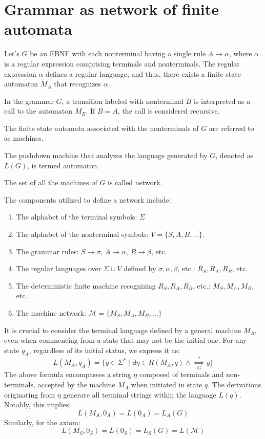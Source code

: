 \section{Grammar as network of finite automata}

Let's $G$ be an EBNF with each nonterminal having a single rule $A \rightarrow \alpha$, where $\alpha$ is a regular expression comprising terminals and nonterminals.
The regular expression $\alpha$ defines a regular language, and thus, there exists a finite state automaton $M_A$ that recognizes $\alpha$.

In the grammar $G$, a transition labeled with nonterminal $B$ is interpreted as a call to the automaton $M_B$.
If $B=A$, the call is considered recursive.

\begin{definition}
    The finite state automata associated with the nonterminals of $G$ are referred to as machines. 
\end{definition}
\begin{definition}
    The pushdown machine that analyzes the language generated by $G$, denoted as $L(G)$, is termed automaton. 
\end{definition}
\begin{definition}
    The set of all the machines of $G$ is called network.
\end{definition}
The components utilized to define a network include:
\begin{enumerate}
    \item The alphabet of the terminal symbols: $\Sigma$
    \item The alphabet of the nonterminal symbols: $V=\{S,A,B,\dots\}$.
    \item The grammar rules: $S \rightarrow \sigma$, $A \rightarrow \alpha$, $B \rightarrow \beta$, etc. 
    \item The regular languages over $\Sigma \cup V$ defined by $\sigma, \alpha, \beta$, etc.: $R_S,R_A,R_B$, etc. 
    \item The deterministic finite machine recognizing $R_S,R_A,R_B$, etc.: $M_S,M_A,M_B$, etc. 
    \item The machine network: $\mathcal{M}=\{M_S,M_A,M_B,\dots\}$
\end{enumerate}

It is crucial to consider the terminal language defined by a general machine $M_A$, even when commencing from a state that may not be the initial one.
For any state $q_A$, regardless of its initial status, we express it as:
\[L(M_A,q_A)=\{y \in \Sigma^{\ast}\mid \exists\eta\in R(M_A,q) \land \overset{\ast}{\underset{G}{\implies}} y\}\]
The above formula encompasses a string $\eta$ composed of terminals and non-terminals, accepted by the machine $M_A$ when initiated in state $q$. 
The derivations originating from $\eta$ generate all terminal strings within the language $L(q)$. 
Notably, this implies:
\[L(M_A,0_A)=L(0_A) = L_A(G)\]
Similarly, for the axiom:
\[L(M_S,0_S)=L(0_S)=L_S(G) = L(\mathcal{M})\]

